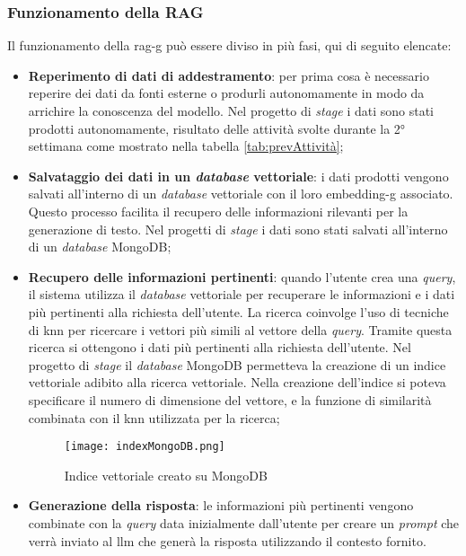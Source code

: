 \subsubsection{Funzionamento della RAG}
Il funzionamento della \gls{rag-g} può essere diviso in più fasi, qui di seguito elencate:
\begin{itemize}
    \item \textbf{Reperimento di dati di addestramento}: per prima cosa è necessario reperire dei dati da fonti esterne o produrli autonomamente in modo da arrichire la conoscenza del modello. Nel progetto di \textit{stage} i dati sono stati prodotti autonomamente, risultato delle attività svolte durante la 2° settimana come mostrato nella tabella \ref{tab:prevAttività};
    \item \textbf{Salvataggio dei dati in un \textit{database} vettoriale}: i dati prodotti vengono salvati all'interno di un \textit{database} vettoriale con il loro \gls{embedding-g} associato. Questo processo facilita il recupero delle informazioni rilevanti per la generazione di testo. Nel progetti di \textit{stage} i dati sono stati salvati all'interno di un \textit{database} MongoDB;
    \item \textbf{Recupero delle informazioni pertinenti}: quando l'utente crea una \textit{query}, il sistema utilizza il \textit{database} vettoriale per recuperare le informazioni e i dati più pertinenti alla richiesta dell'utente. La ricerca coinvolge l'uso di tecniche di \gls{knn} per ricercare i vettori più simili al vettore della \textit{query}. Tramite questa ricerca si ottengono i dati più pertinenti alla richiesta dell'utente. Nel progetto di \textit{stage} il \textit{database} MongoDB permetteva la creazione di un indice vettoriale adibito alla ricerca vettoriale. Nella creazione dell'indice si poteva specificare il numero di dimensione del vettore, e la funzione di similarità combinata con il \gls{knn} utilizzata per la ricerca;
    \begin{figure}[H]
        \centering  
        \texttt{[image: indexMongoDB.png]}
        \caption{Indice vettoriale creato su MongoDB}
        \label{fig:indexMongoDB}
    \end{figure}
    \item \textbf{Generazione della risposta}: le informazioni più pertinenti vengono combinate con la \textit{query} data inizialmente dall'utente per creare un \textit{prompt} che verrà inviato al \gls{llm} che generà la risposta utilizzando il contesto fornito.
\end{itemize}


